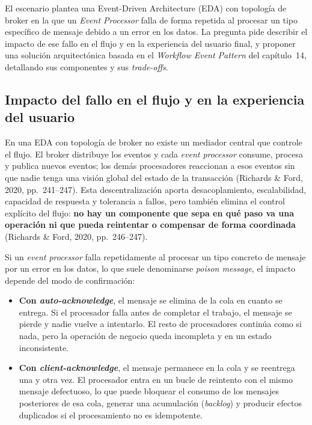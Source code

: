 \documentclass[12pt,a4paper]{article}
\begin{document}
El escenario plantea una Event-Driven Architecture (EDA) con topología de broker en la que un \emph{Event Processor} falla de forma repetida al procesar un tipo específico de mensaje debido a un error en los datos. La pregunta pide describir el impacto de ese fallo en el flujo y en la experiencia del usuario final, y proponer una solución arquitectónica basada en el \emph{Workflow Event Pattern} del capítulo~14, detallando sus componentes y sus \emph{trade-offs}.

\subsection{Impacto del fallo en el flujo y en la experiencia del usuario}

En una EDA con topología de broker no existe un mediador central que controle el flujo. El broker distribuye los eventos y cada \emph{event processor} consume, procesa y publica nuevos eventos; los demás procesadores reaccionan a esos eventos sin que nadie tenga una visión global del estado de la transacción (Richards \& Ford, 2020, pp.~241--247). Esta descentralización aporta desacoplamiento, escalabilidad, capacidad de respuesta y tolerancia a fallos, pero también elimina el control explícito del flujo: \textbf{no hay un componente que sepa en qué paso va una operación ni que pueda reintentar o compensar de forma coordinada} (Richards \& Ford, 2020, pp.~246--247).

Si un \emph{event processor} falla repetidamente al procesar un tipo concreto de mensaje por un error en los datos, lo que suele denominarse \emph{poison message}, el impacto depende del modo de confirmación:

\begin{itemize}[label=$\cdot$]
  \item \textbf{Con \emph{auto-acknowledge}}, el mensaje se elimina de la cola en cuanto se entrega. Si el procesador falla antes de completar el trabajo, el mensaje se pierde y nadie vuelve a intentarlo. El resto de procesadores continúa como si nada, pero la operación de negocio queda incompleta y en un estado inconsistente.
  \item \textbf{Con \emph{client-acknowledge}}, el mensaje permanece en la cola y se reentrega una y otra vez. El procesador entra en un bucle de reintento con el mismo mensaje defectuoso, lo que puede bloquear el consumo de los mensajes posteriores de esa cola, generar una acumulación (\emph{backlog}) y producir efectos duplicados si el procesamiento no es idempotente.
\end{itemize}
\end{document}
